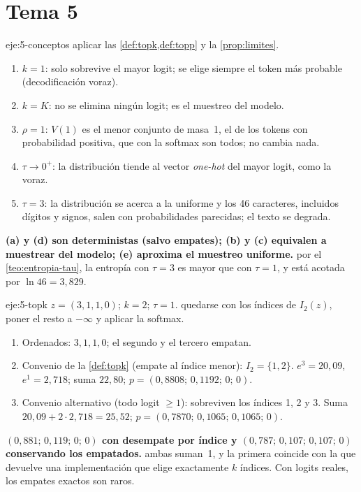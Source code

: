 \section{Tema 5}

\begin{solucion}{eje:5-conceptos}
\planteamiento aplicar las \cref{def:topk,def:topp} y la \cref{prop:limites}.
\pasos
\begin{enumerate}[label=(\alph*)]
  \item $k=1$: solo sobrevive el mayor logit; se elige siempre el token más probable (decodificación voraz).
  \item $k=K$: no se elimina ningún logit; es el muestreo del modelo.
  \item $\rho=1$: $V(1)$ es el menor conjunto de masa~1, el de los tokens con probabilidad positiva, que con la softmax son todos; no cambia nada.
  \item $\tau\to 0^{+}$: la distribución tiende al vector \emph{one-hot} del mayor logit, como la voraz.
  \item $\tau=3$: la distribución se acerca a la uniforme y los 46 caracteres, incluidos dígitos y signos, salen con probabilidades parecidas; el texto se degrada.
\end{enumerate}
\resultado \textbf{(a) y (d) son deterministas (salvo empates); (b) y (c) equivalen a muestrear del modelo; (e) aproxima el muestreo uniforme.}
\comprobacion por el \cref{teo:entropia-tau}, la entropía con $\tau=3$ es mayor que con $\tau=1$, y está acotada por $\ln 46=3{,}829$.
\end{solucion}

\begin{solucion}{eje:5-topk}
\datos $z=(3,1,1,0)$; $k=2$; $\tau=1$.
\planteamiento quedarse con los índices de $I_2(z)$, poner el resto a $-\infty$ y aplicar la softmax.
\pasos
\begin{enumerate}[label=\arabic*.]
  \item Ordenados: $3,1,1,0$; el segundo y el tercero empatan.
  \item Convenio de la \cref{def:topk} (empate al índice menor): $I_2=\{1,2\}$. $e^{3}=20{,}09$, $e^{1}=2{,}718$; suma $22{,}80$; $p=(0{,}8808;\allowbreak\,0{,}1192;\allowbreak\,0;\allowbreak\,0)$.
  \item Convenio alternativo (todo logit $\ge 1$): sobreviven los índices 1, 2 y 3. Suma $20{,}09+2\cdot 2{,}718=25{,}52$; $p=(0{,}7870;\allowbreak\,0{,}1065;\allowbreak\,0{,}1065;\allowbreak\,0)$.
\end{enumerate}
\resultado \textbf{$(0{,}881;\allowbreak\,0{,}119;\allowbreak\,0;\allowbreak\,0)$ con desempate por índice y $(0{,}787;\allowbreak\,0{,}107;\allowbreak\,0{,}107;\allowbreak\,0)$ conservando los empatados.}
\comprobacion ambas suman~1, y la primera coincide con la que devuelve una implementación que elige exactamente $k$ índices. Con logits reales, los empates exactos son raros.
\end{solucion}

